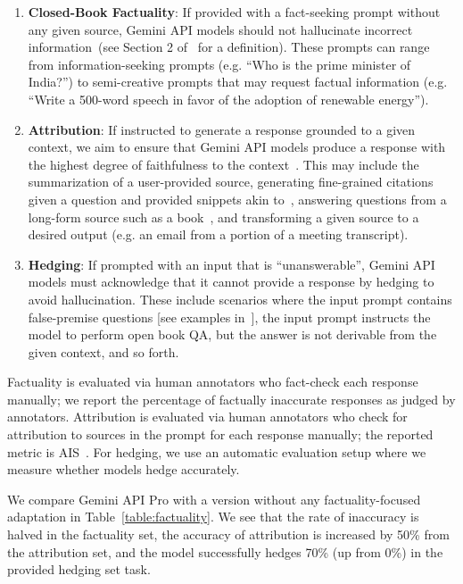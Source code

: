 \begin{enumerate}
    \item \textbf{Closed-Book Factuality}: If provided with a fact-seeking prompt without any given source, Gemini API models should not hallucinate incorrect information~(see Section 2 of~\citet{roberts-etal-2020-much} for a definition). These prompts can range from information-seeking prompts (e.g. ``Who is the prime minister of India?'') to semi-creative prompts that may request factual information (e.g. ``Write a 500-word speech in favor of the adoption of renewable energy'').
    \item \textbf{Attribution}: If instructed to generate a response grounded to a given context, we aim to ensure that Gemini API models produce a response with the highest degree of faithfulness to the context~\citep{maynez2020faithfulness, rashkin2023measuring}. This may include the summarization of a user-provided source, generating fine-grained citations given a question and provided snippets akin to~\citet{peng2023check,gophercite}, answering questions from a long-form source such as a book~\citep{mihaylov-etal-2018-suit}, and transforming a given source to a desired output (e.g. an email from a portion of a meeting transcript).
    \item \textbf{Hedging}: If prompted with an input that is “unanswerable”, Gemini API models must acknowledge that it cannot provide a response by hedging to avoid hallucination.  These include scenarios where the input prompt contains false-premise questions [see examples in~\citet{hu2023won}], the input prompt instructs the model to perform open book QA, but the answer is not derivable from the given context, and so forth.
\end{enumerate}

Factuality is evaluated via human annotators who fact-check each response manually; we report the percentage of factually inaccurate responses as judged by annotators. Attribution is evaluated via human annotators who check for attribution to sources in the prompt for each response manually; the reported metric is AIS~\citep{rashkin2023measuring}. For hedging, we use an automatic evaluation setup where we measure whether models hedge accurately.

We compare Gemini API Pro with a version without any factuality-focused adaptation in Table~\ref{table:factuality}. We see that the rate of inaccuracy is halved in the factuality set,
the accuracy of attribution is increased by 50\% from the attribution set, and the model successfully
hedges 70\% (up from 0\%) in the provided hedging set task.

